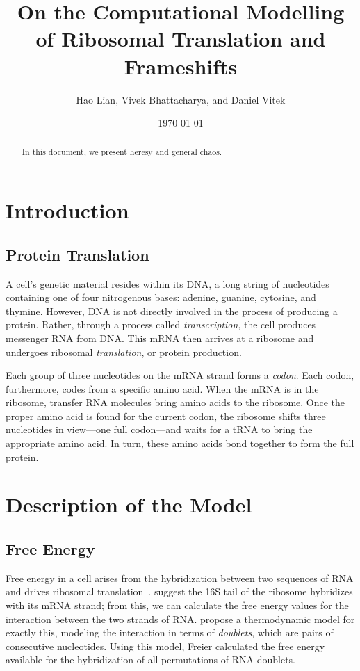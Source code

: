\documentclass[12pt, draft]{article}
\author{{\sc Hao Lian, Vivek Bhattacharya, and Daniel Vitek}}
\date{{\sc \today}}
\title{{\bf On the Computational Modelling of Ribosomal Translation
    and Frameshifts}}
\numberwithin{equation}{section}
\begin{document}
\maketitle
\tableofcontents
\clearpage

\begin{abstract}
  In this document, we present heresy and general chaos.
\end{abstract}

\clearpage

\section{Introduction}

\subsection{Protein Translation}

A cell's genetic material resides within its DNA, a long string
of nucleotides containing one of four nitrogenous bases: adenine,
guanine, cytosine, and thymine.  However, DNA is not
directly involved in the process of producing a protein.  Rather, through
a process called \emph{transcription}, the cell produces messenger RNA from DNA.
This mRNA then arrives at a ribosome and undergoes ribosomal \emph{translation}, or
protein production.

Each group of three nucleotides on the mRNA strand forms a \emph{codon}.
Each codon, furthermore, codes from a specific amino acid.  When the mRNA
is in the ribosome, transfer RNA molecules bring amino acids
to the ribosome.  Once the proper amino acid is found for the current codon,
the ribosome shifts three nucleotides in view---one full codon---and waits
for a tRNA to bring the appropriate amino acid.  In turn, these amino acids
bond together to form the full protein.

\section{Description of the Model}
\label{allmodel}

\subsection{Free Energy}
\label{freeenergy}

Free energy in a cell arises from the hybridization between two
sequences of RNA and drives ribosomal translation~\cite{starmer}.
\citet{weiss88} suggest the 16S tail of the ribosome hybridizes with its mRNA strand;
from this, we can calculate the free energy values for the interaction between the two strands of RNA.
\citet{freier} propose a thermodynamic model for exactly this,
modeling the interaction in terms of \emph{doublets}, which are pairs of consecutive nucleotides.
Using this model, Freier calculated the free energy available
for the hybridization of all permutations of RNA doublets.
\end{document}
